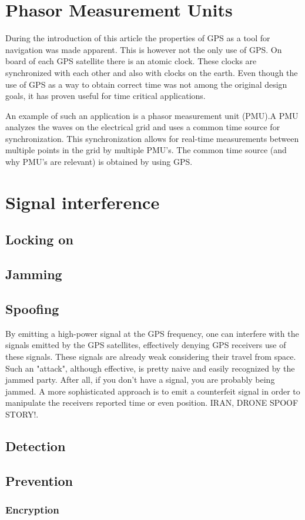 \documentclass[12pt,english,a4paper]{article}
\begin{document}
\section{Phasor Measurement Units}
During the introduction of this article the properties of GPS as a tool for navigation was made apparent. This is however not the only use of GPS. On board of each GPS satellite there is an atomic clock. These clocks are synchronized with each other and also with clocks on the earth. Even though the use of GPS as a way to obtain correct time was not among the original design goals, it has proven useful for time critical applications. 

An example of such an application is a phasor measurement unit (PMU).A PMU analyzes the waves on the electrical grid and uses a common time source for synchronization. This synchronization allows for real-time measurements between multiple points in the grid by multiple PMU's. The common time source (and why PMU's are relevant) is obtained by using GPS.
\cite{YLJRNR}

\section{Signal interference}
\subsection{Locking on}
\subsection{Jamming}
\subsection{Spoofing}

By emitting a high-power signal at the GPS frequency, one can interfere with the signals emitted by the GPS satellites, effectively denying GPS receivers use of these signals. These signals are already weak considering their travel from space. Such an "attack", although effective, is pretty naive and easily recognized by the jammed party. After all, if you don't have a signal, you are probably being jammed. A more sophisticated approach is to emit a counterfeit signal in order to manipulate the receivers reported time or even position. IRAN, DRONE SPOOF STORY!. 


\subsection{Detection}
\subsection{Prevention}
\subsubsection{Encryption}

\newpage
\printbibliography[title={Complete Bibliography},heading=bibintoc]
\end{document}

